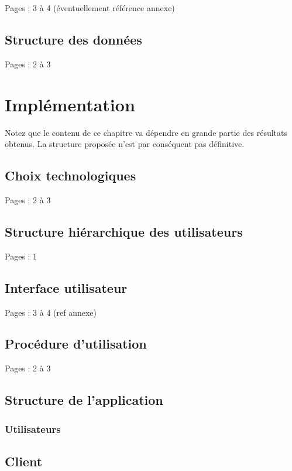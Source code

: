\documentclass{eplmastersthesis_FR}
\begin{document}
			Pages : 3 à 4 (éventuellement référence annexe)

		\section{Structure des données}

			Pages : 2 à 3

	\chapter{Implémentation}
		Notez que le contenu de ce chapitre va dépendre en grande partie des résultats obtenus. La structure proposée n'est par conséquent pas définitive.

		\section{Choix technologiques}

			Pages : 2 à 3

		\section{Structure hiérarchique des utilisateurs}

			Pages : 1

		\section{Interface utilisateur}

			Pages : 3 à 4 (ref annexe)

		\section{Procédure d'utilisation}

			Pages : 2 à 3

		\section{Structure de l'application}

			\subsection*{Utilisateurs}

		\section{Client}
\end{document}
